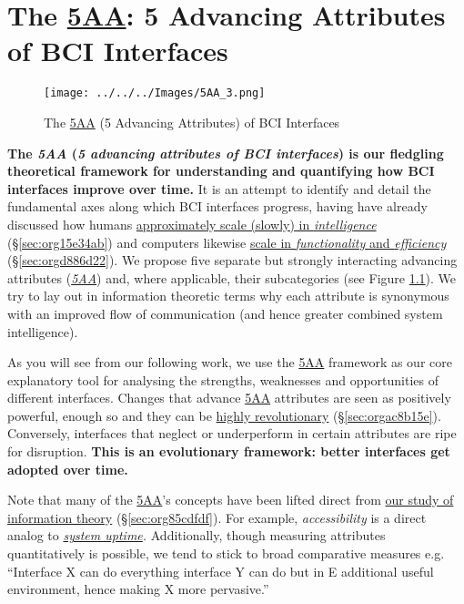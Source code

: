 \documentclass[logo,bsc,singlespacing,parskip]{infthesis}
\begin{document}
\chapter{The \hyperref[orgafbfd0c]{5AA}: 5 Advancing Attributes of BCI Interfaces}
\label{sec:orgb0e25d2}
\begin{figure}[H]
\centering
\texttt{[image: ../../../Images/5AA\_3.png]}
\caption{\label{fig:5AA}The \hyperref[orgafbfd0c]{5AA} (5 Advancing Attributes) of BCI Interfaces}
\end{figure}

\textbf{The \emph{\label{orgafbfd0c}5AA} (\emph{5 advancing attributes of BCI interfaces}) is our fledgling theoretical framework for understanding and quantifying how BCI interfaces improve over time.}
It is an attempt to identify and detail the fundamental axes along which BCI interfaces progress, having have already discussed how humans \hyperref[sec:org15e34ab]{approximately scale (slowly) in \emph{intelligence}} (\S \ref{sec:org15e34ab}) and computers likewise \hyperref[sec:orgd886d22]{scale in \emph{functionality} and \emph{efficiency}} (\S \ref{sec:orgd886d22}).
We propose five separate but strongly interacting advancing attributes (\emph{\hyperref[orgafbfd0c]{5AA}}) and, where applicable, their subcategories (see Figure \ref{fig:5AA}).
We try to lay out in information theoretic terms why each attribute is synonymous with an improved flow of communication (and hence greater combined system intelligence).

As you will see from our following work, we use the \hyperref[orgafbfd0c]{5AA} framework as our core explanatory tool for analysing the strengths, weaknesses and opportunities of different interfaces.
Changes that advance \hyperref[orgafbfd0c]{5AA} attributes are seen as positively powerful, enough so and they can be \hyperref[sec:orgac8b15e]{highly revolutionary} (\S \ref{sec:orgac8b15e}).
Conversely, interfaces that neglect or underperform in certain attributes are ripe for disruption.
\textbf{This is an evolutionary framework: better interfaces get adopted over time.}

Note that many of the \hyperref[orgafbfd0c]{5AA}'s concepts have been lifted direct from \hyperref[sec:org85cdfdf]{our study of information theory} (\S \ref{sec:org85cdfdf}).
For example, \emph{accessibility} is a direct analog to \emph{\hyperref[org7eec694]{system uptime}.}
Additionally, though measuring attributes quantitatively is possible, we tend to stick to broad comparative measures e.g. ``Interface X can do everything interface Y can do but in E additional useful environment, hence making X more pervasive.''
\end{document}
